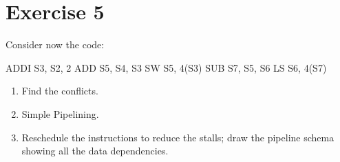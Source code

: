 \section{Exercise 5}

Consider now the code:
\begin{verbnobox}[\verbarg]
ADDI S3, S2, 2
ADD S5, S4, S3
SW S5, 4(S3)
SUB S7, S5, S6
LS S6, 4(S7)
\end{verbnobox}
\begin{enumerate}
    \item Find the conflicts. 
    \item Simple Pipelining. 
    \item Reschedule the instructions to reduce the stalls; draw the pipeline schema showing all the data dependencies.
\end{enumerate}


